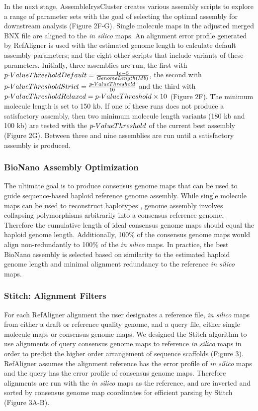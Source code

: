 \documentclass{bmcart}
\begin{document}
In the next stage, AssembleIrysCluster creates various assembly scripts to explore a range of parameter sets with the goal of selecting the optimal assembly for downstream analysis (Figure 2F-G). Single molecule maps in the adjusted merged BNX file are aligned to the \textit{in silico} maps. An alignment error profile generated by RefAligner is used with the estimated genome length to calculate default assembly parameters; and the eight other scripts that include variants of these parameters. Initially, three assemblies are run, the first with $p\textnormal{-}Value Threshold Default = \frac{1e-5}{Genome Length (Mb)}$, the second with  $p\textnormal{-}Value Threshold Strict = \frac{p\textnormal{-}Value Threshold}{10}$ and the third with $p\textnormal{-}Value Threshold Relaxed = {p\textnormal{-}Value Threshold} \times {10}$ (Figure 2F). The minimum molecule length is set to 150 kb. If one of these runs does not produce a satisfactory assembly, then two minimum molecule length variants (180 kb and 100 kb) are tested with the $p\textnormal{-}Value Threshold$ of the current best assembly (Figure 2G). Between three and nine assemblies are run until a satisfactory assembly is produced.

\subsubsection*{BioNano Assembly Optimization}

The ultimate goal is to produce consensus genome maps that can be used to guide sequence-based haploid reference genome assembly. While single molecule maps can be used to reconstruct haplotypes \cite{MHCLam}, genome assembly involves collapsing polymorphisms arbitrarily into a consensus reference genome. Therefore the cumulative length of ideal consensus genome maps should equal the haploid genome length. Additionally, 100\% of the consensus genome maps would align non-redundantly to 100\% of the \textit{in silico} maps. In practice, the best BioNano assembly is selected based on similarity to the estimated haploid genome length and minimal alignment redundancy to the reference \textit{in silico} maps.

\subsubsection*{Stitch: Alignment Filters}

For each RefAligner alignment the user designates a reference file, \textit{in silico} maps from either a draft or reference quality genome, and a query file, either single molecule maps or consensus genome maps. We designed the Stitch algorithm to use alignments of query consensus genome maps to reference \textit{in silico} maps in order to predict the higher order arrangement of sequence scaffolds  (Figure 3). RefAligner assumes the alignment reference has the error profile of \textit{in silico} maps and the query has the error profile of consensus genome maps. Therefore alignments are run with the \textit{in silico} maps as the reference, and are inverted and sorted by consensus genome map coordinates for efficient parsing by Stitch (Figure 3A-B). 
\end{document}
